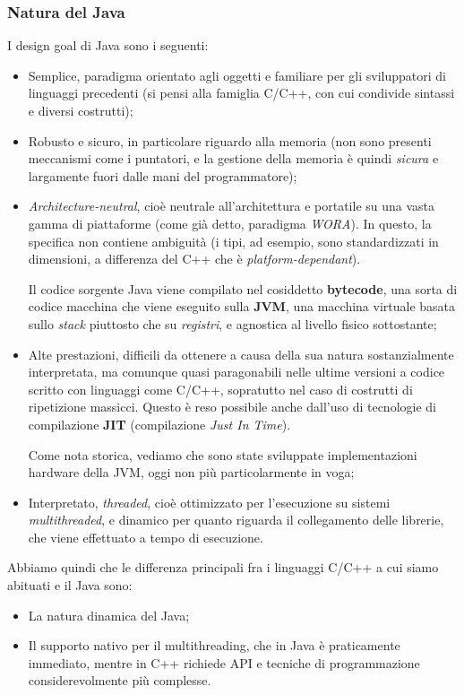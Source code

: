\documentclass[a4paper,11pt]{article}
\begin{document}
\subsubsection{Natura del Java}
I design goal di Java sono i seguenti: 
\begin{itemize}
	\item Semplice, paradigma orientato agli oggetti e familiare per gli sviluppatori di linguaggi precedenti (si pensi alla famiglia C/C++, con cui condivide sintassi e diversi costrutti);
	\item Robusto e sicuro, in particolare riguardo alla memoria (non sono presenti meccanismi come i puntatori, e la gestione della memoria è quindi \textit{sicura} e largamente fuori dalle mani del programmatore);
	\item \textit{Architecture-neutral}, cioè neutrale all'architettura e portatile su una vasta gamma di piattaforme (come già detto, paradigma \textit{WORA}). In questo, la specifica non contiene ambiguità (i tipi, ad esempio, sono standardizzati in dimensioni, a differenza del C++ che è \textit{platform-dependant}).

		Il codice sorgente Java viene compilato nel cosiddetto \textbf{bytecode}, una sorta di codice macchina che viene eseguito sulla \textbf{JVM}, una macchina virtuale basata sullo \textit{stack} piuttosto che su \textit{registri}, e agnostica al livello fisico sottostante;
	\item Alte prestazioni, difficili da ottenere a causa della sua natura sostanzialmente interpretata, ma comunque quasi paragonabili nelle ultime versioni a codice scritto con linguaggi come C/C++, sopratutto nel caso di costrutti di ripetizione massicci.
		Questo è reso possibile anche dall'uso di tecnologie di compilazione \textbf{JIT} (compilazione \textit{Just In Time}).

		Come nota storica, vediamo che sono state sviluppate implementazioni hardware della JVM, oggi non più particolarmente in voga;
	\item Interpretato, \textit{threaded}, cioè ottimizzato per l'esecuzione su sistemi \textit{multithreaded}, e dinamico per quanto riguarda il collegamento delle librerie, che viene effettuato a tempo di esecuzione.
\end{itemize}

Abbiamo quindi che le differenza principali fra i linguaggi C/C++ a cui siamo abituati e il Java sono:
\begin{itemize}
	\item La natura dinamica del Java;
	\item Il supporto nativo per il multithreading, che in Java è praticamente immediato, mentre in C++ richiede API e tecniche di programmazione considerevolmente più complesse.
\end{itemize}
\end{document}
